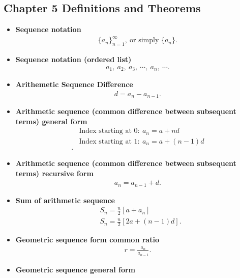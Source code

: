 \documentclass{report}
\begin{document}
\subsection{Chapter 5 Definitions and Theorems}
\bigbreak \noindent 
\begin{itemize}
    \item \textbf{Sequence notation}
        \begin{align*}
            \{a_{n}\}_{n=1}^{\infty},\ \text{or simply } \{a_{n}\}
        .\end{align*}
    \item \textbf{Sequence notation (ordered list)}
        \begin{align*}
            a_{1},\ a_{2},\ a_{3},\ \cdots,\ a_{n},\ \cdots
        .\end{align*}
    \item \textbf{Arithemetic Sequence Difference}
        \begin{align*}
            d = a_{n} - a_{n-1}
        .\end{align*}
    \item \textbf{Arithmetic sequence (common difference between subsequent terms) general form}
        \begin{align*}
            &\text{Index starting at 0}:\ a_{n} = a + nd \\
            &\text{Index starting at 1}:\ a_{n} = a + (n-1)d \\
        .\end{align*}
    \item \textbf{Arithmetic sequence (common difference between subsequent terms) recursive form}
        \begin{align*}
            a_{n} = a_{n-1} + d
        .\end{align*}
    \item \textbf{Sum of arithmetic sequence}
        \begin{align*}
            &S_{n} = \frac{n}{2}\left[a + a_{n}\right] \\
            &S_{n} = \frac{n}{2}\left[2a + (n-1)d\right]
        .\end{align*}
    \item \textbf{Geometric sequence form common ratio}
        \begin{align*}
            r = \frac{a_{n}}{a_{n-1}}
        .\end{align*}
    \item \textbf{Geometric sequence general form}
        \begin{align*}

\end{align*}
\end{itemize}
\end{document}
